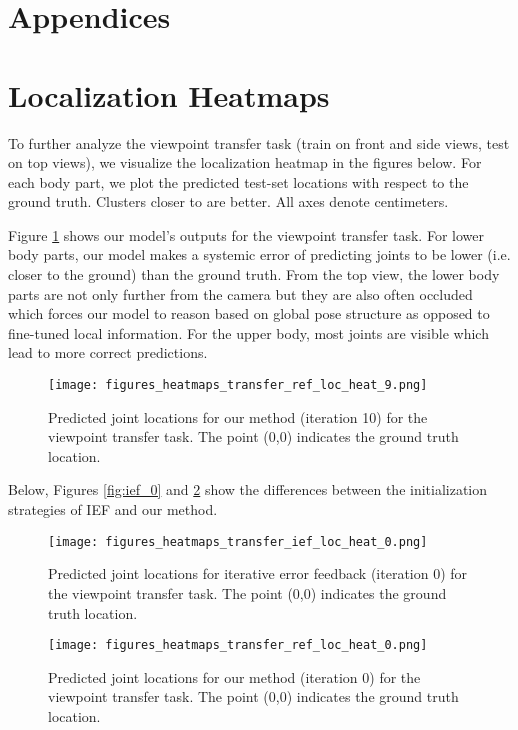 \documentclass[runningheads]{llncs}
\begin{document}
\clearpage

	\newpage
	\appendix
	\section*{Appendices}
	\section{Localization Heatmaps}
	\vspace{-2mm}
	To further analyze the viewpoint transfer task (train on front and side views, test on top views), we visualize the localization heatmap in the figures below. For each body part, we plot the predicted test-set locations with respect to the ground truth. Clusters closer to  are better. All axes denote centimeters.
	
	Figure \ref{fig:ref_9} shows our model's outputs for the viewpoint transfer task. For lower body parts, our model makes a systemic error of predicting joints to be lower (i.e. closer to the ground) than the ground truth. From the top view, the lower body parts are not only further from the camera but they are also often occluded which forces our model to reason based on global pose structure as opposed to fine-tuned local information. For the upper body, most joints are visible which lead to more correct predictions.
	
	\vspace{-3mm}
	\begin{figure}[h]
		\centering
		\texttt{[image: figures\_heatmaps\_transfer\_ref\_loc\_heat\_9.png]}
		\vspace{-6mm}
		\caption{Predicted joint locations for our method (iteration 10) for the viewpoint transfer task. The point (0,0) indicates the ground truth location.}
		\label{fig:ref_9}
	\end{figure}
	
	\newpage
	\noindent Below, Figures \ref{fig:ief_0} and \ref{fig:ref_0} show the differences between the initialization strategies of IEF and our method.
	\vspace{-3mm}
	\begin{figure}[h!]
		\centering
		\texttt{[image: figures\_heatmaps\_transfer\_ief\_loc\_heat\_0.png]}
		\vspace{-6mm}
		\caption{Predicted joint locations for iterative error feedback (iteration 0) for the viewpoint transfer task. The point (0,0) indicates the ground truth location.}\label{fig:ief_0}
		\vspace{2mm}
		\texttt{[image: figures\_heatmaps\_transfer\_ref\_loc\_heat\_0.png]}
		\vspace{-6mm}
		\caption{Predicted joint locations for our method (iteration 0) for the viewpoint transfer task. The point (0,0) indicates the ground truth location.}\label{fig:ref_0}
	\end{figure}
	\vspace{-3mm}
	
\end{document}
